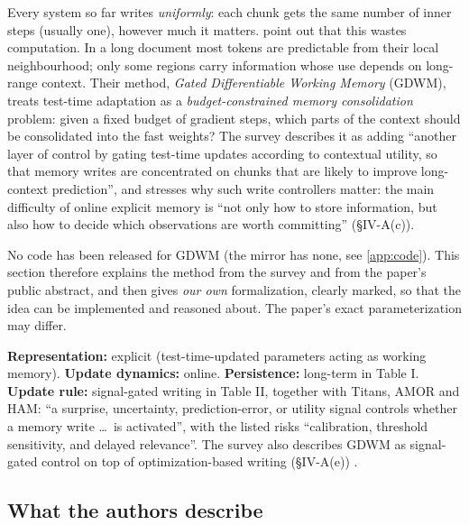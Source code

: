 Every system so far writes \emph{uniformly}: each chunk gets the same number of inner steps
(usually one), however much it matters. \citet{mei2026gdwm} point out that this wastes
computation. In a long document most tokens are predictable from their local neighbourhood;
only some regions carry information whose use depends on long-range context. Their method,
\emph{Gated Differentiable Working Memory} (GDWM), treats test-time adaptation as a
\emph{budget-constrained memory consolidation} problem: given a fixed budget of gradient steps,
which parts of the context should be consolidated into the fast weights? The survey describes
it as adding ``another layer of control by gating test-time updates according to contextual
utility, so that memory writes are concentrated on chunks that are likely to improve
long-context prediction'', and stresses why such write controllers matter: the main difficulty
of online explicit memory is ``not only how to store information, but also how to decide which
observations are worth committing'' (\S IV-A(c)).

No code has been released for GDWM (the mirror has none, see \cref{app:code}). This section
therefore explains the method from the survey and from the paper's public abstract, and then
gives \emph{our own} formalization, clearly marked, so that the idea can be implemented and
reasoned about. The paper's exact parameterization may differ.

\begin{taxonomy}
\textbf{Representation:} explicit (test-time-updated parameters acting as working memory).
\textbf{Update dynamics:} online. \textbf{Persistence:} long-term in Table I.
\textbf{Update rule:} signal-gated writing in Table II, together with Titans, AMOR and HAM:
``a surprise, uncertainty, prediction-error, or utility signal controls whether a memory
write \dots\ is activated'', with the listed risks ``calibration, threshold sensitivity, and
delayed relevance''. The survey also describes GDWM as signal-gated control on top of
optimization-based writing (\S IV-A(e)) \citep{zhoubian2026memory}.
\end{taxonomy}

\subsection{What the authors describe}

